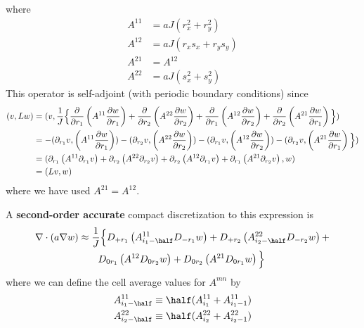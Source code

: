 \documentclass[10pt]{article}
\newcommand{\grad}{\nabla}
\begin{document}
where
\begin{align*}
   A^{11} &= a J (r_x^2 + r_y^2) \\
   A^{12} &= a J (r_x s_x + r_y s_y) \\
   A^{21} &= A^{12} \\
   A^{22} &= a J (s_x^2 + s_y^2)
\end{align*}
This operator is self-adjoint (with periodic boundary conditions) since 
\begin{align*}
 (v,Lw) &= (v,{1\over J} \Big\lbrace  
        {\partial\over\partial r_1}\left( A^{11} {\partial w \over\partial r_1} \right) +
        {\partial\over\partial r_2}\left( A^{22} {\partial w \over\partial r_2} \right) + 
        {\partial\over\partial r_1}\left( A^{12} {\partial w \over\partial r_2} \right) + 
        {\partial\over\partial r_2}\left( A^{21} {\partial w \over\partial r_1} \right) \Big\rbrace) \\
    &= -( \partial_{r_1} v, \left( A^{11} {\partial w \over\partial r_1} \right) )
       -( \partial_{r_2} v, \left( A^{22} {\partial w \over\partial r_2} \right) )
       -( \partial_{r_1} v,\left( A^{12} {\partial w \over\partial r_2} \right) ) 
       -( \partial_{r_2} v, \left( A^{21} {\partial w \over\partial r_1} \right) \Big\rbrace) \\
    &= (  \partial_{r_1}\left( A^{11}\partial_{r_1} v\right)+
          \partial_{r_2}\left(A^{22} \partial_{r_2} v\right) +
          \partial_{r_2}\left(A^{12} \partial_{r_1} v\right) +
          \partial_{r_1}\left(A^{21} \partial_{r_2} v\right) , w) \\
    &= (Lv,w)
\end{align*}
where we have used $A^{21}=A^{12}$.
          




A {\bf second-order accurate} compact discretization to this expression is
\begin{align*}
  \grad\cdot( a \grad w) & \approx {1\over J} \Big\lbrace
        D_{+ r_1}\left( A^{11}_{i_1-\half}D_{- r_1}w \right) +
        D_{+ r_2}\left( A^{22}_{i_2-\half}D_{- r_2}w \right) + \\
&\qquad D_{0 r_1}\left( A^{12}            D_{0 r_2}w \right) + 
        D_{0 r_2}\left( A^{21}            D_{0 r_1}w \right) \Big\rbrace 
\end{align*}
where we can define the cell average values for $A^{mn}$ by
\begin{align*}
   A^{11}_{i_1-\half} &\equiv \half( A^{11}_{i_1}+A^{11}_{i_1-1} ) \\
   A^{22}_{i_2-\half} &\equiv \half( A^{22}_{i_2}+A^{22}_{i_2-1} )
\end{align*}
\end{document}
